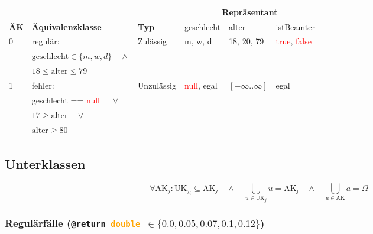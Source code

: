 \documentclass{article}
\begin{document}
\begin{enumerate}[label=\alph*.]
            \begin{tabularx}{\textwidth}{|p{3em}|X|p{7em}|p{5em}|p{7em}|p{5em}|}
                \hline
                \cellcolor[gray]{0.75} & \cellcolor[gray]{0.75} & \cellcolor[gray]{0.75} & \multicolumn{3}{c|}{\cellcolor[gray]{0.75} \textbf{Repräsentant}}\\
                \multirow{-2}{*}{\cellcolor[gray]{0.75} \textbf{ÄK}} & \multirow{-2}{*}{\cellcolor[gray]{0.75} \textbf{Äquivalenzklasse}} & \multirow{-2}{*}{\cellcolor[gray]{0.75} \textbf{Typ}} & \cellcolor[gray]{0.75} geschlecht & \cellcolor[gray]{0.75} alter & \cellcolor[gray]{0.75} istBeamter\\\hline  
                0 & regulär: & Zulässig & m, w, d & 18, 20, 79 & \textcolor{red}{true}, \textcolor{red}{false} \\
                & $\mathrm{geschlecht} \in \{m, w, d\} \quad \land$ & & & & \\
                & $18 \leq \mathrm{alter} \leq 79$ & & & & \\\hline
                1 & fehler: & Unzulässig & \textcolor{red}{null}, egal & $[-\infty..\infty]$ & egal \\
                & geschlecht == \textcolor{red}{null} $\quad \lor$ & & & & \\
                & $17 \geq \mathrm{alter} \quad \lor$ & & & & \\
                & $\mathrm{alter} \geq 80$ & & & & \\\hline
            \end{tabularx}

            \subsection*{Unterklassen}

            \[
                \forall \mathrm{AK}_j : \mathrm{UK}_{j_i} \subseteq \mathrm{AK}_j \quad \land \quad 
                \bigcup_{u \in \mathrm{UK}_j} u = \mathrm{AK_j} \quad \land \quad 
                \bigcup_{a \in \mathrm{AK}} a = \Omega
            \]

            \subsubsection*{Regulärfälle (\texttt{@return \textcolor{orange}{double} $\in \{0.0, 0.05, 0.07, 0.1, 0.12\}$})}
            

\end{enumerate}
\end{document}
